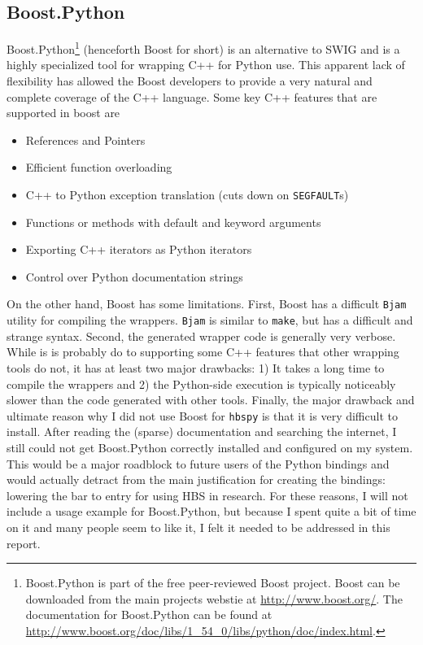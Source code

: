 \subsection{Boost.Python} \label{sub:boost_python}
  Boost.Python\footnote{Boost.Python is part of the free peer-reviewed Boost project. Boost can be downloaded from the main projects webstie at \url{http://www.boost.org/}. The documentation for Boost.Python can be found at \url{http://www.boost.org/doc/libs/1_54_0/libs/python/doc/index.html}.} (henceforth Boost for short) is an alternative to SWIG and is a highly specialized tool for wrapping C++ for Python use. This apparent lack of flexibility has allowed the Boost developers to provide a very natural and complete coverage of the C++ language. Some key C++ features that are supported in boost are

  \begin{itemize}
    \itemsep -.2in
    \item References and Pointers
    \item Efficient function overloading
    \item C++ to Python exception translation (cuts down on \texttt{SEGFAULT}s)
    \item Functions or methods with default and keyword arguments
    \item Exporting C++ iterators as Python iterators
    \item Control over Python documentation strings
  \end{itemize}

  On the other hand, Boost has some limitations. First, Boost has a difficult \texttt{Bjam} utility for compiling the wrappers. \texttt{Bjam} is similar to \texttt{make}, but has a difficult and strange syntax. Second, the generated wrapper code is generally very verbose. While is is probably do to supporting some C++ features that other wrapping tools do not, it has at least two major drawbacks: 1) It takes a long time to compile the wrappers and 2) the Python-side execution is typically noticeably slower than the code generated with other tools. Finally, the major drawback and ultimate reason why I did not use Boost for \texttt{hbspy} is that it is very difficult to install. After reading the (sparse) documentation and searching the internet, I still could not get Boost.Python correctly installed and configured on my system. This would be a major roadblock to future users of the Python bindings and would actually detract from the main justification for creating the bindings: lowering the bar to entry for using HBS in research. For these reasons, I will not include a usage example for Boost.Python, but because I spent quite a bit of time on it and many people seem to like it, I felt it needed to be addressed in this report.

